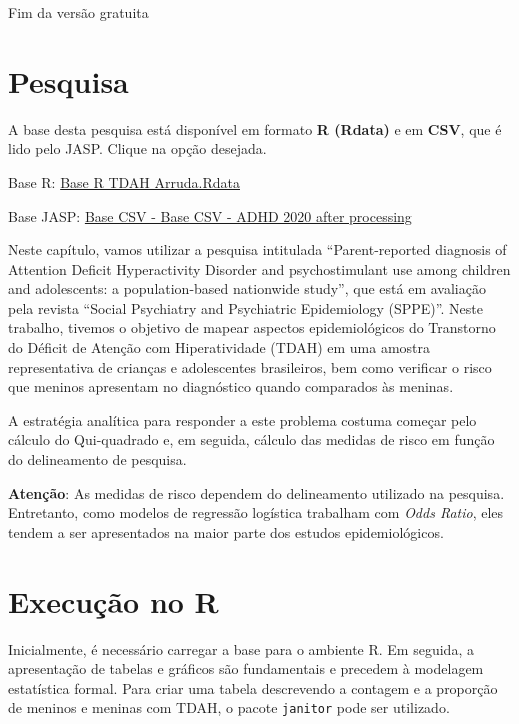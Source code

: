 \documentclass[
]{book}
\newenvironment{base}{
  \definecolor{shadecolor}{rgb}{0.764,0.992,0.686}  %
  \color{black}
  \begin{shaded}}
 {\end{shaded}}
\begin{document}
Fim da versão gratuita

\hypertarget{pesquisa-2}{%
\section{Pesquisa}\label{pesquisa-2}}

\begin{base}
A base desta pesquisa está disponível em formato \textbf{R (Rdata)} e em \textbf{CSV}, que é lido pelo JASP. Clique na opção desejada.

Base R: \href{https://github.com/anovabr/mqt/raw/master/bases/Base\%20R\%20TDAH\%20Arruda.RData}{Base R TDAH Arruda.Rdata}

Base JASP: \href{https://github.com/anovabr/mqt/raw/master/bases/bases_csv_jasp.zip}{Base CSV - Base CSV - ADHD 2020 after processing}

\end{base}

Neste capítulo, vamos utilizar a pesquisa intitulada ``Parent-reported diagnosis of Attention Deficit Hyperactivity Disorder and psychostimulant use among children and adolescents: a population-based nationwide study'', que está em avaliação pela revista ``Social Psychiatry and Psychiatric Epidemiology (SPPE)''. Neste trabalho, tivemos o objetivo de mapear aspectos epidemiológicos do Transtorno do Déficit de Atenção com Hiperatividade (TDAH) em uma amostra representativa de crianças e adolescentes brasileiros, bem como verificar o risco que meninos apresentam no diagnóstico quando comparados às meninas.

A estratégia analítica para responder a este problema costuma começar pelo cálculo do Qui-quadrado e, em seguida, cálculo das medidas de risco em função do delineamento de pesquisa.

\textbf{Atenção}: As medidas de risco dependem do delineamento utilizado na pesquisa. Entretanto, como modelos de regressão logística trabalham com \emph{Odds Ratio}, eles tendem a ser apresentados na maior parte dos estudos epidemiológicos.

\hypertarget{execuuxe7uxe3o-no-r-2}{%
\section{Execução no R}\label{execuuxe7uxe3o-no-r-2}}

Inicialmente, é necessário carregar a base para o ambiente R. Em seguida, a apresentação de tabelas e gráficos são fundamentais e precedem à modelagem estatística formal. Para criar uma tabela descrevendo a contagem e a proporção de meninos e meninas com TDAH, o pacote \texttt{janitor} pode ser utilizado.
\end{document}
